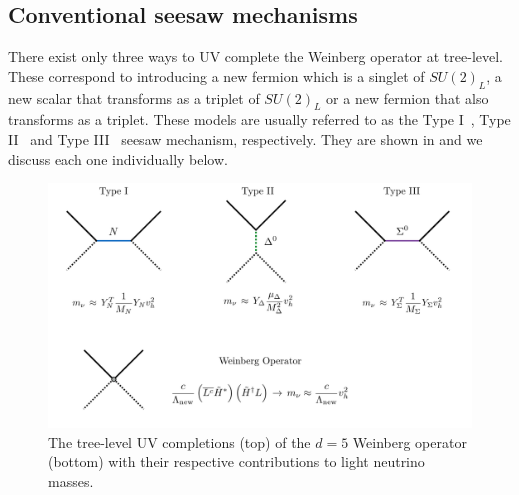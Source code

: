 \subsection{Conventional seesaw mechanisms}\label{sec:seesaws}

There exist only three ways to UV complete the Weinberg operator at tree-level. These correspond to introducing a new fermion which is a singlet of $SU(2)_L$, a new scalar that transforms as a triplet of $SU(2)_L$ or a new fermion that also transforms as a triplet. These models are usually referred to as the Type I~\cite{Minkowski:1977sc,Mohapatra:1979ia,Yanagida:1979as,GellMann:1980vs}, Type II~\cite{Konetschny:1977bn,Cheng:1980qt,Lazarides:1980nt,Schechter:1980gr,Mohapatra:1980yp} and Type III~\cite{Foot:1988aq} seesaw mechanism, respectively. They are shown in  and we discuss each one individually below.
%
\begin{figure}[t]
\centering
\includegraphics[width=\textwidth]{seesaw_mechanisms.pdf}
\caption[The tree-level UV completions of the Weinberg operator.]{The tree-level UV completions (top) of the $d=5$ Weinberg operator (bottom) with their respective contributions to light neutrino masses.\label{fig:seesaw_mechanisms}}
\end{figure}
%


